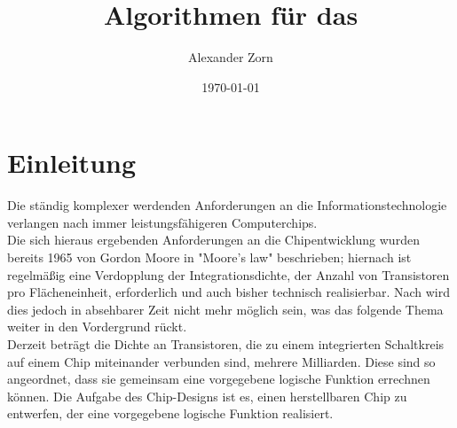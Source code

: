\documentclass[11pt, a4paper, german]{article}
\author{Alexander Zorn}
\date{\today}
\title{Algorithmen f\"ur das \TM}
\begin{document}
\setlength{\parindent}{0pt} %
\maketitle

\tableofcontents
\newpage 
\section{Einleitung}
\label{sec:einleitung}
Die ständig komplexer werdenden Anforderungen an die Informationstechnologie verlangen nach immer leistungsfähigeren Computerchips. \\
Die sich hieraus ergebenden Anforderungen an die Chipentwicklung wurden bereits 1965 von Gordon Moore in "Moore's law"  \cite{Moore} beschrieben; hiernach ist regelmäßig eine Verdopplung der Integrationsdichte, der Anzahl von Transistoren pro Flächeneinheit, erforderlich und auch bisher technisch realisierbar. Nach \cite{Khan} wird dies jedoch in absehbarer Zeit nicht mehr möglich sein, was das folgende Thema weiter in den Vordergrund rückt.\\
Derzeit beträgt die Dichte an Transistoren, die zu einem integrierten Schaltkreis auf einem Chip miteinander verbunden sind, mehrere Milliarden. Diese sind so angeordnet, dass sie gemeinsam eine vorgegebene logische Funktion errechnen können. Die Aufgabe des Chip-Designs ist es, einen herstellbaren Chip zu entwerfen, der eine vorgegebene logische Funktion realisiert.\\
\end{document}
